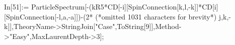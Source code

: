 In[51]:= ParticleSpectrum[-(kR5*CD[-i][SpinConnection[k,l,-k]]*CD[i][SpinConnection[-l,a,-a]])-(2* (*omitted 1031 characters for brevity*) j,k,-k]],TheoryName->StringJoin["Case",ToString[9]],Method->"Easy",MaxLaurentDepth->3];